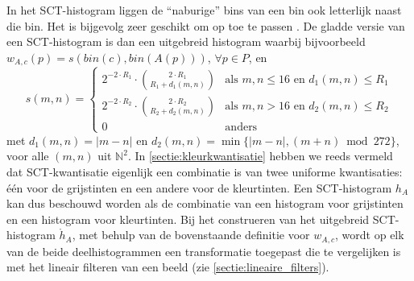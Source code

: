 In het SCT-histogram liggen de ``naburige'' bins van een bin ook letterlijk naast
die bin. Het is bijgevolg zeer geschikt om
 op toe te passen \cite{sural:perceptually_smooth_histogram}. De gladde versie van
een SCT-histogram is dan een uitgebreid histogram waarbij bijvoorbeeld 
$w_{A,c}(p)=s(bin(c),bin(A(p)))$, $\forall p \in P$, en
\begin{displaymath}
s(m,n)=
\begin{cases}
2^{-2 \cdot R_1} \cdot \binom{2 \cdot R_1}{R_1 + d_1(m,n)} & \textrm{als } m, n \le 16 \textrm{ en } d_1(m,n) \le R_1 \\[4pt]
2^{-2 \cdot R_2} \cdot \binom{2 \cdot R_2}{R_2 + d_2(m,n)} & \textrm{als } m, n > 16 \textrm{ en } d_2(m,n) \le R_2 \\[4pt]
0 & \textrm{anders}
\end{cases}
\end{displaymath}
met $d_1(m,n)=|m-n|$ en $d_2(m,n)=\min\{|m-n|, (m+n) \bmod 272\}$,
voor alle $(m,n)$ uit $\mathbb{N}^2$. In \ref{sectie:kleurkwantisatie} hebben 
we reeds vermeld dat SCT-kwantisatie eigenlijk een combinatie is van twee 
uniforme kwantisaties: \'e\'en voor de grijstinten en een andere voor de 
kleurtinten. Een SCT-histogram $h_A$ kan dus beschouwd 
worden als de combinatie van een histogram voor grijstinten en een histogram 
voor kleurtinten. 
Bij het construeren van het uitgebreid SCT-histogram $\mathring{h}_A$, met behulp van de bovenstaande 
definitie voor $w_{A,c}$, wordt op elk van de beide deelhistogrammen een 
transformatie toegepast die te vergelijken is met het lineair filteren van
een beeld (zie \ref{sectie:lineaire_filters}). 

